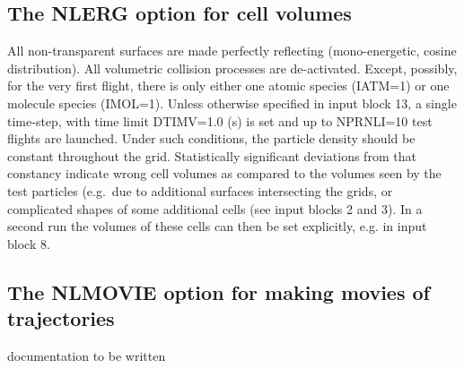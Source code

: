 \subsection{The NLERG option for cell volumes}\label{NLERG}

All non-transparent surfaces are made perfectly reflecting (mono-energetic,
cosine distribution).
All volumetric collision processes are de-activated.
Except, possibly, for the very first flight, there is only either one atomic
species (IATM=1) or one molecule species (IMOL=1).
Unless otherwise specified in input block 13, a single time-step, with time
limit DTIMV=\num{1.0} (\si{\second}) is set and up to NPRNLI=10 test flights
are launched.
Under such conditions, the particle density should be constant throughout the
grid.
Statistically significant deviations from that constancy indicate wrong cell
volumes as compared to the volumes seen by the test particles (e.g.\ due to
additional surfaces intersecting the grids, or complicated shapes of some
additional cells (see input blocks 2 and 3).
In a second run the volumes of these cells can then be set explicitly, e.g. in
input block 8.

\subsection{The NLMOVIE option for making movies of trajectories}\label{NLMOVIE}

documentation to be written
